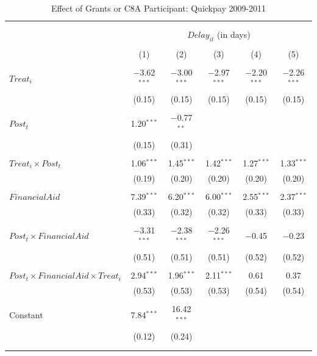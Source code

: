 \documentclass[
]{article}
\begin{document}
\begin{table}[H] \centering 
  \caption{Effect of Grants or C8A Participant: Quickpay 2009-2011} 
  \label{} 
\small 
\begin{tabular}{@{\extracolsep{-2pt}}lccccc} 
\\[-1.8ex]\hline 
\hline \\[-1.8ex] 
\\[-1.8ex] & \multicolumn{5}{c}{$Delay_{it}$ (in days)} \\ 
\\[-1.8ex] & (1) & (2) & (3) & (4) & (5)\\ 
\hline \\[-1.8ex] 
 $Treat_i$ & $-$3.62$^{***}$ & $-$3.00$^{***}$ & $-$2.97$^{***}$ & $-$2.20$^{***}$ & $-$2.26$^{***}$ \\ 
  & (0.15) & (0.15) & (0.15) & (0.15) & (0.15) \\ 
  & & & & & \\ 
 $Post_t$ & 1.20$^{***}$ & $-$0.77$^{**}$ &  &  &  \\ 
  & (0.15) & (0.31) &  &  &  \\ 
  & & & & & \\ 
 $Treat_i \times Post_t$ & 1.06$^{***}$ & 1.45$^{***}$ & 1.42$^{***}$ & 1.27$^{***}$ & 1.33$^{***}$ \\ 
  & (0.19) & (0.20) & (0.20) & (0.20) & (0.20) \\ 
  & & & & & \\ 
 $FinancialAid$ & 7.39$^{***}$ & 6.20$^{***}$ & 6.00$^{***}$ & 2.55$^{***}$ & 2.37$^{***}$ \\ 
  & (0.33) & (0.32) & (0.32) & (0.33) & (0.33) \\ 
  & & & & & \\ 
 $Post_t \times FinancialAid$ & $-$3.31$^{***}$ & $-$2.38$^{***}$ & $-$2.26$^{***}$ & $-$0.45 & $-$0.23 \\ 
  & (0.51) & (0.51) & (0.51) & (0.52) & (0.52) \\ 
  & & & & & \\ 
 $Post_t \times FinancialAid \times Treat_i$ & 2.94$^{***}$ & 1.96$^{***}$ & 2.11$^{***}$ & 0.61 & 0.37 \\ 
  & (0.53) & (0.53) & (0.53) & (0.54) & (0.54) \\ 
  & & & & & \\ 
 Constant & 7.84$^{***}$ & 16.42$^{***}$ &  &  &  \\ 
  & (0.12) & (0.24) &  &  &  \\ 
  & & & & & \\ 
\hline \\[-1.8ex] 

\end{tabular}
\end{table}
\end{document}
